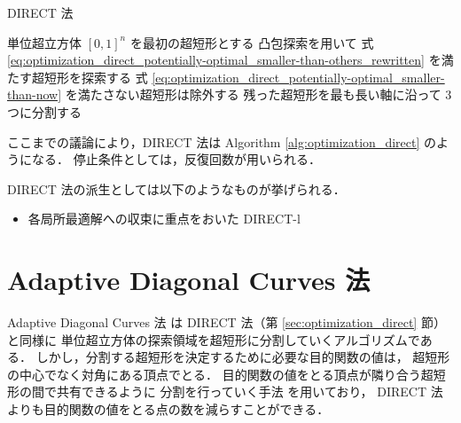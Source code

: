 \begin{algorithm}[tp]
    \caption{DIRECT 法}
    \label{alg:optimization_direct}
    \begin{algorithmic}
        \State 単位超立方体 $[0, 1]^n$ を最初の超短形とする
        \Loop
        \State 凸包探索を用いて
        式 \eqref{eq:optimization_direct_potentially-optimal_smaller-than-others_rewritten}
        を満たす超短形を探索する
        \State 式 \eqref{eq:optimization_direct_potentially-optimal_smaller-than-now}
        を満たさない超短形は除外する
        \State 残った超短形を最も長い軸に沿って 3 つに分割する
        \State \Return
        \EndIf
        \EndLoop
        \EndProcedure
    \end{algorithmic}
\end{algorithm}

ここまでの議論により，DIRECT 法は
Algorithm \ref{alg:optimization_direct} のようになる．
停止条件としては，反復回数が用いられる．

DIRECT 法の派生としては以下のようなものが挙げられる．

\begin{itemize}
    \item 各局所最適解への収束に重点をおいた DIRECT-l \cite{Gablonsky2001}
\end{itemize}

\section{Adaptive Diagonal Curves 法}

Adaptive Diagonal Curves 法 \cite{Sergeyev2006} は
DIRECT 法（第 \ref{sec:optimization_direct} 節）と同様に
単位超立方体の探索領域を超短形に分割していくアルゴリズムである．
しかし，分割する超短形を決定するために必要な目的関数の値は，
超短形の中心でなく対角にある頂点でとる．
目的関数の値をとる頂点が隣り合う超短形の間で共有できるように
分割を行っていく手法 \cite{Sergeyev2000} を用いており，
DIRECT 法よりも目的関数の値をとる点の数を減らすことができる．

